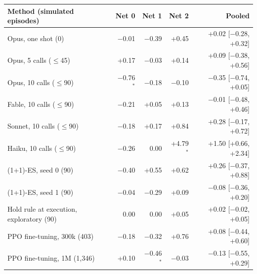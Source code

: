 \begin{tabular}{lrrrr}
\toprule
Method (simulated episodes) & Net 0 & Net 1 & Net 2 & Pooled \\
\midrule
Opus, one shot (0) & $-$0.01 & $-$0.39 & +0.45 & +0.02 [$-$0.28, +0.32] \\
Opus, 5 calls ($\le$45) & +0.17 & $-$0.03 & +0.14 & +0.09 [$-$0.38, +0.56] \\
Opus, 10 calls ($\le$90) & $-$0.76$^{*}$ & $-$0.18 & $-$0.10 & $-$0.35 [$-$0.74, +0.05] \\
Fable, 10 calls ($\le$90) & $-$0.21 & +0.05 & +0.13 & $-$0.01 [$-$0.48, +0.46] \\
Sonnet, 10 calls ($\le$90) & $-$0.18 & +0.17 & +0.84 & +0.28 [$-$0.17, +0.72] \\
Haiku, 10 calls ($\le$90) & $-$0.26 & 0.00 & +4.79$^{*}$ & +1.50 [+0.66, +2.34] \\
(1+1)-ES, seed 0 (90) & $-$0.40 & +0.55 & +0.62 & +0.26 [$-$0.37, +0.88] \\
(1+1)-ES, seed 1 (90) & $-$0.04 & $-$0.29 & +0.09 & $-$0.08 [$-$0.36, +0.20] \\
Hold rule at execution, exploratory (90) & 0.00 & 0.00 & +0.05 & +0.02 [$-$0.02, +0.05] \\
PPO fine-tuning, 300k (403) & $-$0.18 & $-$0.32 & +0.76 & +0.08 [$-$0.44, +0.60] \\
PPO fine-tuning, 1M (1,346) & +0.10 & $-$0.46$^{*}$ & $-$0.03 & $-$0.13 [$-$0.55, +0.29] \\
\bottomrule
\end{tabular}

